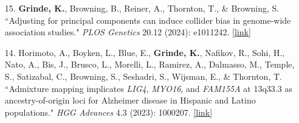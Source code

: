 \documentclass[margin]{res}
\newcommand{\annotateItem}[1]{
	\begin{itemize} \vspace{-0.1cm}
	\item[] 
	\begin{footnotesize}\textcolor{black}{(#1)}\end{footnotesize}
	\end{itemize} \vspace{-0.1cm}
}
\begin{document}
\begin{resume}
\begin{itemize}
\item[15.] \textbf{Grinde, K.}, Browning, B., Reiner, A., Thornton, T., \& Browning, S. ``Adjusting for principal components can induce collider bias in genome-wide association studies." \textit{PLOS Genetics} 20.12 (2024):  e1011242. \href{https://doi.org/10.1371/journal.pgen.1011242}{[link]}

\item[14.] Horimoto, A., Boyken, L., Blue, E., \textbf{Grinde, K.}, Nafikov, R., Sohi, H., Nato, A., Bis, J., Brusco, L., Morelli, L., Ramirez, A., Dalmasso, M.,  Temple, S., Satizabal, C., Browning, S., Seshadri, S., Wijsman, E., \& Thornton, T. ``Admixture mapping implicates \textit{LIG4}, \textit{MYO16}, and \textit{FAM155A} at 13q33.3 as ancestry-of-origin loci for Alzheimer disease in Hispanic and Latino populations." \textit{HGG Advances} 4.3 (2023): 1000207.  
\href{https://www.cell.com/hgg-advances/pdf/S2666-2477(23)00039-8.pdf}{[link]}


\end{itemize}
\end{resume}
\end{document}
